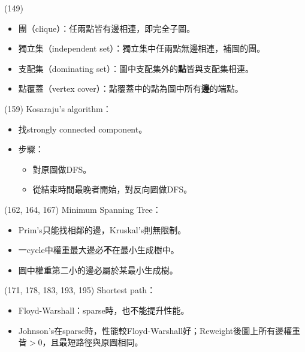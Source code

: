 \item \begin{theorem}{(149)} \quad\quad
    \begin{itemize}
        \item 團（clique）：任兩點皆有邊相連，即完全子圖。
        \item 獨立集（independent set）：獨立集中任兩點無邊相連，補圖的團。
        \item 支配集（dominating set）：圖中支配集外的\textbf{點}皆與支配集相連。
        \item 點覆蓋（vertex cover）：點覆蓋中的點為圖中所有\textbf{邊}的端點。
    \end{itemize}
\end{theorem}

\item \begin{theorem}{(159)} Kosaraju's algorithm： \begin{itemize}
        \item 找strongly connected component。
        \item 步驟：\begin{itemize}
            \item 對原圖做DFS。
            \item 從結束時間最晚者開始，對反向圖做DFS。
        \end{itemize}
    \end{itemize}
\end{theorem}

\item \begin{theorem}{(162, 164, 167)} Minimum Spanning Tree： \begin{itemize}
        \item Prim's只能找相鄰的邊，Kruskal's則無限制。
        \item 一cycle中權重最大邊必\textbf{不}在最小生成樹中。
        \item 圖中權重第二小的邊必屬於某最小生成樹。
    \end{itemize}
\end{theorem}

\item \begin{theorem}{(171, 178, 183, 193, 195)} Shortest path： \begin{itemize}
        \item Floyd-Warshall：sparse時，也不能提升性能。
        \item Johnson's在sparse時，性能較Floyd-Warshall好；Reweight後圖上所有邊權重皆$>0$，且最短路徑與原圖相同。
    \end{itemize}
\end{theorem}


